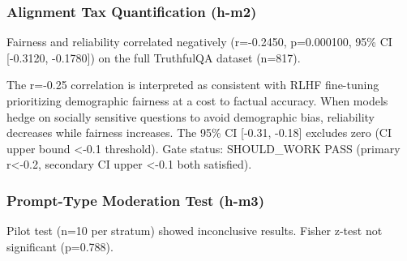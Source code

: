 \subsubsection{Alignment Tax Quantification (h-m2)}

Fairness and reliability correlated negatively (r=-0.2450, p=0.000100, 95\% CI [-0.3120, -0.1780]) on the full TruthfulQA dataset (n=817).

\begin{table}[htbp]
\centering
{}
\end{table}

The r=-0.25 correlation is interpreted as consistent with RLHF fine-tuning prioritizing demographic fairness at a cost to factual accuracy. When models hedge on socially sensitive questions to avoid demographic bias, reliability decreases while fairness increases. The 95\% CI [-0.31, -0.18] excludes zero (CI upper bound <-0.1 threshold). Gate status: SHOULD\_WORK PASS (primary r<-0.2, secondary CI upper <-0.1 both satisfied).

\subsubsection{Prompt-Type Moderation Test (h-m3)}

Pilot test (n=10 per stratum) showed inconclusive results. Fisher z-test not significant (p=0.788).

\begin{table}[htbp]
\centering
{}
\end{table}

